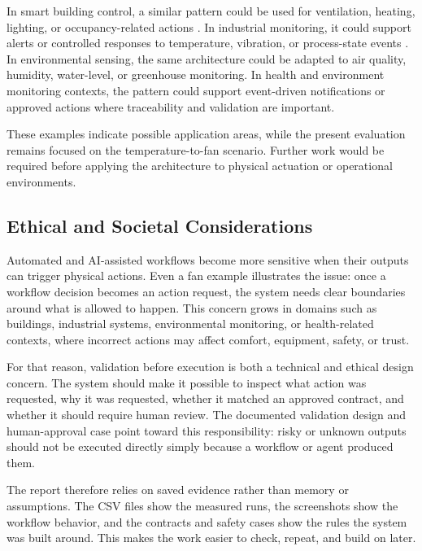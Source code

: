 In smart building control, a similar pattern could be used for ventilation, heating, lighting, or occupancy-related actions \cite{smartBuildingsMinoli2017}. In industrial monitoring, it could support alerts or controlled responses to temperature, vibration, or process-state events \cite{industrialIotXu2018}. In environmental sensing, the same architecture could be adapted to air quality, humidity, water-level, or greenhouse monitoring. In health and environment monitoring contexts, the pattern could support event-driven notifications or approved actions where traceability and validation are important.

These examples indicate possible application areas, while the present evaluation remains focused on the temperature-to-fan scenario. Further work would be required before applying the architecture to physical actuation or operational environments.

\subsection{Ethical and Societal Considerations}\label{subsec:discussion-ethical-societal}

Automated and AI-assisted workflows become more sensitive when their outputs can trigger physical actions. Even a fan example illustrates the issue: once a workflow decision becomes an action request, the system needs clear boundaries around what is allowed to happen. This concern grows in domains such as buildings, industrial systems, environmental monitoring, or health-related contexts, where incorrect actions may affect comfort, equipment, safety, or trust.

For that reason, validation before execution is both a technical and ethical design concern. The system should make it possible to inspect what action was requested, why it was requested, whether it matched an approved contract, and whether it should require human review. The documented validation design and human-approval case point toward this responsibility: risky or unknown outputs should not be executed directly simply because a workflow or agent produced them.

The report therefore relies on saved evidence rather than memory or assumptions. The CSV files show the measured runs, the screenshots show the workflow behavior, and the contracts and safety cases show the rules the system was built around. This makes the work easier to check, repeat, and build on later.
